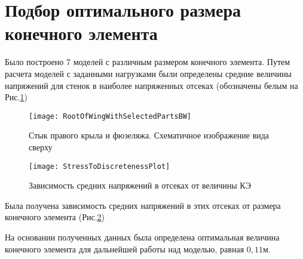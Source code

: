 \section{Подбор оптимального размера конечного элемента}

Было построено 7 моделей с различным размером конечного элемента. Путем расчета моделей с заданными нагрузками были определены средние величины напряжений для стенок в наиболее напряженных отсеках (обозначены белым на  Рис.\ref{fig:WingRootPlain})

\begin{figure}[ht]
\centering
\texttt{[image: RootOfWingWithSelectedPartsBW]}
\caption{Стык правого крыла и фюзеляжа. Схематичное изображение вида сверху}
\label{fig:WingRootPlain}
\end{figure}


\begin{figure}[H]
\centering
\texttt{[image: StressToDiscretenessPlot]}
\caption{Зависимость средних напряжений в отсеках от величины КЭ}
\label{fig:stressToDiscreteness}
\end{figure}

Была получена зависимость средних напряжений в этих отсеках от размера конечного элемента (Рис.\ref{fig:stressToDiscreteness})

На основании полученных данных была определена оптимальная величина конечного элемента для дальнейшей работы над моделью, равная $0,11\text{м}$. 
